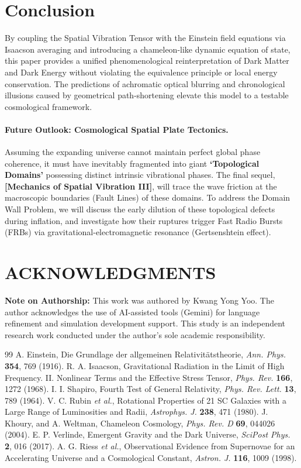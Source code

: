 \documentclass[reprint,amsmath,amssymb,aps,prd]{revtex4-2}
\begin{document}
\section{Conclusion}
By coupling the Spatial Vibration Tensor with the Einstein field equations via Isaacson averaging and introducing a chameleon-like dynamic equation of state, this paper provides a unified phenomenological reinterpretation of Dark Matter and Dark Energy without violating the equivalence principle or local energy conservation.
The predictions of achromatic optical blurring and chronological illusions caused by geometrical path-shortening elevate this model to a testable cosmological framework.

\paragraph{Future Outlook: Cosmological Spatial Plate Tectonics.}
Assuming the expanding universe cannot maintain perfect global phase coherence, it must have inevitably fragmented into giant \textbf{`Topological Domains'} possessing distinct intrinsic vibrational phases.
The final sequel, \textbf{[Mechanics of Spatial Vibration III]}, will trace the wave friction at the macroscopic boundaries (Fault Lines) of these domains.
To address the Domain Wall Problem, we will discuss the early dilution of these topological defects during inflation, and investigate how their ruptures trigger Fast Radio Bursts (FRBs) via gravitational-electromagnetic resonance (Gertsenshtein effect).

\section*{ACKNOWLEDGMENTS}
\textbf{Note on Authorship:} This work was authored by Kwang Yong Yoo.
The author acknowledges the use of AI-assisted tools (Gemini) for language refinement and simulation development support.
This study is an independent research work conducted under the author's sole academic responsibility.

\begin{thebibliography}{99}
 A. Einstein, Die Grundlage der allgemeinen Relativit\"{a}tstheorie, \textit{Ann. Phys.} \textbf{354}, 769 (1916).
 R. A. Isaacson, Gravitational Radiation in the Limit of High Frequency. II. Nonlinear Terms and the Effective Stress Tensor, \textit{Phys. Rev.} \textbf{166}, 1272 (1968).
 I. I. Shapiro, Fourth Test of General Relativity, \textit{Phys. Rev. Lett.} \textbf{13}, 789 (1964).
 V. C. Rubin \textit{et al.}, Rotational Properties of 21 SC Galaxies with a Large Range of Luminosities and Radii, \textit{Astrophys. J.} \textbf{238}, 471 (1980).
 J. Khoury, and A. Weltman, Chameleon Cosmology, \textit{Phys. Rev. D} \textbf{69}, 044026 (2004).
 E. P. Verlinde, Emergent Gravity and the Dark Universe, \textit{SciPost Phys.} \textbf{2}, 016 (2017).
 A. G. Riess \textit{et al.}, Observational Evidence from Supernovae for an Accelerating Universe and a Cosmological Constant, \textit{Astron. J.} \textbf{116}, 1009 (1998).
\end{thebibliography}
\end{document}
